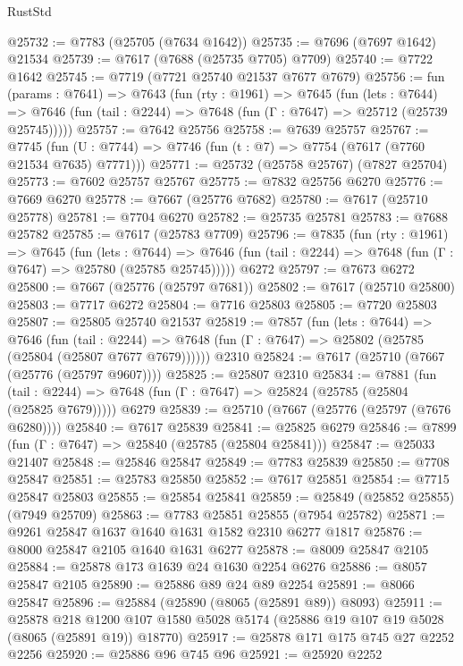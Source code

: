 \begin{lexlean}{RustStd}
\begin{coremodule}
@25732 := @7783 (@25705 (@7634 @1642))
@25735 := @7696 (@7697 @1642) @21534
@25739 := @7617 (@7688 (@25735 @7705) @7709)
@25740 := @7722 @1642
@25745 := @7719 (@7721 @25740 @21537 @7677 @7679)
@25756 := fun (params : @7641) =>
  @7643
    (fun (rty : @1961) =>
    @7645
      (fun (lets : @7644) =>
      @7646 (fun (tail : @2244) => @7648 (fun (Γ : @7647) => @25712 (@25739 @25745)))))
@25757 := @7642 @25756
@25758 := @7639 @25757
@25767 := @7745
    (fun (U : @7744) => @7746 (fun (t : @7) => @7754 (@7617 (@7760 @21534 @7635) @7771)))
@25771 := @25732 (@25758 @25767) (@7827 @25704)
@25773 := @7602 @25757 @25767
@25775 := @7832 @25756 @6270
@25776 := @7669 @6270
@25778 := @7667 (@25776 @7682)
@25780 := @7617 (@25710 @25778)
@25781 := @7704 @6270
@25782 := @25735 @25781
@25783 := @7688 @25782
@25785 := @7617 (@25783 @7709)
@25796 := @7835
    (fun (rty : @1961) =>
    @7645
      (fun (lets : @7644) =>
      @7646 (fun (tail : @2244) => @7648 (fun (Γ : @7647) => @25780 (@25785 @25745)))))
    @6272
@25797 := @7673 @6272
@25800 := @7667 (@25776 (@25797 @7681))
@25802 := @7617 (@25710 @25800)
@25803 := @7717 @6272
@25804 := @7716 @25803
@25805 := @7720 @25803
@25807 := @25805 @25740 @21537
@25819 := @7857
    (fun (lets : @7644) =>
    @7646
      (fun (tail : @2244) =>
      @7648 (fun (Γ : @7647) => @25802 (@25785 (@25804 (@25807 @7677 @7679))))))
    @2310
@25824 := @7617 (@25710 (@7667 (@25776 (@25797 @9607))))
@25825 := @25807 @2310
@25834 := @7881
    (fun (tail : @2244) => @7648 (fun (Γ : @7647) => @25824 (@25785 (@25804 (@25825 @7679)))))
    @6279
@25839 := @25710 (@7667 (@25776 (@25797 (@7676 @6280))))
@25840 := @7617 @25839
@25841 := @25825 @6279
@25846 := @7899 (fun (Γ : @7647) => @25840 (@25785 (@25804 @25841)))
@25847 := @25033 @21407
@25848 := @25846 @25847
@25849 := @7783 @25839
@25850 := @7708 @25847
@25851 := @25783 @25850
@25852 := @7617 @25851
@25854 := @7715 @25847 @25803
@25855 := @25854 @25841
@25859 := @25849 (@25852 @25855) (@7949 @25709)
@25863 := @7783 @25851 @25855 (@7954 @25782)
@25871 := @9261 @25847 @1637 @1640 @1631 @1582 @2310 @6277 @1817
@25876 := @8000 @25847 @2105 @1640 @1631 @6277
@25878 := @8009 @25847 @2105
@25884 := @25878 @173 @1639 @24 @1630 @2254 @6276
@25886 := @8057 @25847 @2105
@25890 := @25886 @89 @24 @89 @2254
@25891 := @8066 @25847
@25896 := @25884 (@25890 (@8065 (@25891 @89)) @8093)
@25911 := @25878
    @218
    @1200
    @107
    @1580
    @5028
    @5174
    (@25886 @19 @107 @19 @5028 (@8065 (@25891 @19)) @18770)
@25917 := @25878 @171 @175 @745 @27 @2252 @2256
@25920 := @25886 @96 @745 @96
@25921 := @25920 @2252

\end{coremodule}
\end{lexlean}
